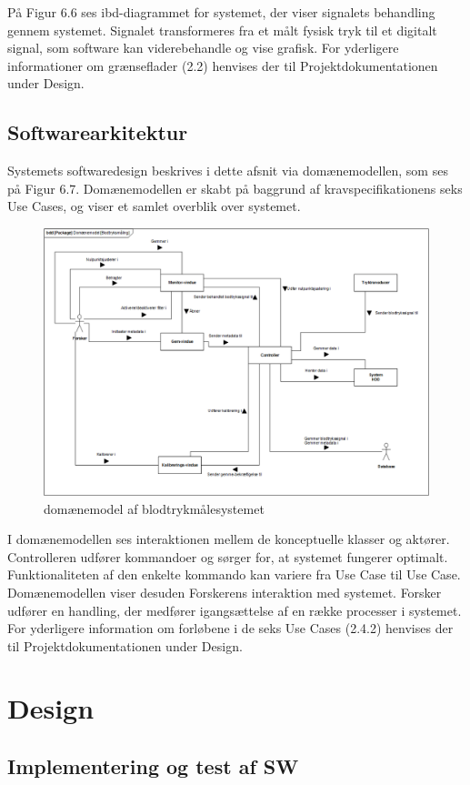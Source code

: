 På Figur 6.6 ses ibd-diagrammet for systemet, der viser signalets behandling gennem systemet. Signalet transformeres fra et målt fysisk tryk til et digitalt signal, som software kan viderebehandle og vise grafisk. For yderligere informationer om grænseflader (2.2) henvises der til Projektdokumentationen under Design. 
\subsection{Softwarearkitektur}
Systemets softwaredesign beskrives i dette afsnit via domænemodellen, som ses på Figur 6.7. Domænemodellen er skabt på baggrund af kravspecifikationens seks Use Cases, og viser et samlet overblik over systemet. 
\begin{figure}[H]
	\centering
	\includegraphics[width=1\textwidth]{Figurer/dm}
	\caption{domænemodel af blodtrykmålesystemet}
\end{figure}
I domænemodellen ses interaktionen mellem de konceptuelle klasser og aktører. Controlleren udfører kommandoer og sørger for, at systemet fungerer optimalt. Funktionaliteten af den enkelte kommando kan variere fra Use Case til Use Case. Domænemodellen viser desuden Forskerens interaktion med systemet. Forsker udfører en handling, der medfører igangsættelse af en række processer i systemet. 
For yderligere information om forløbene i de seks Use Cases (2.4.2) henvises der til Projektdokumentationen under Design. 


\section{Design}

\subsection{Implementering og test af SW}
